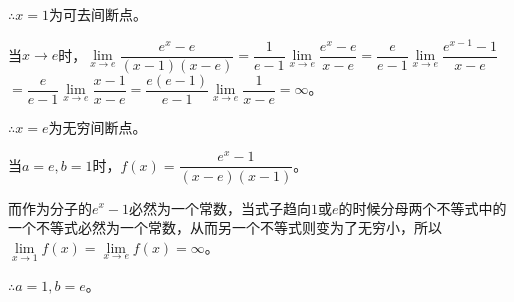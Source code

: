 \documentclass[UTF8, 12pt]{ctexart}
\begin{document}
$\therefore x=1$为可去间断点。\medskip

    当$x\to e$时，$\lim\limits_{x\to e}\dfrac{e^x-e}{(x-1)(x-e)}$$=\dfrac{1}{e-1}\lim\limits_{x\to e}\dfrac{e^x-e}{x-e}$$=\dfrac{e}{e-1}\lim\limits_{x\to e}\dfrac{e^{x-1}-1}{x-e}$\medskip$=\dfrac{e}{e-1}\lim\limits_{x\to e}\dfrac{x-1}{x-e}$$=\dfrac{e(e-1)}{e-1}\lim\limits_{x\to e}\dfrac{1}{x-e}=\infty$。\medskip

$\therefore x=e$为无穷间断点。\medskip

    当$a=e,b=1$时，$f(x)=\dfrac{e^x-1}{(x-e)(x-1)}$。\medskip

    而作为分子的$e^x-1$必然为一个常数，当式子趋向$1$或$e$的时候分母两个不等式中的一个不等式必然为一个常数，从而另一个不等式则变为了无穷小，所以$\lim\limits_{x\to 1}f(x)=\lim\limits_{x\to e}f(x)=\infty$。

$\therefore a=1,b=e$。
\end{document}
